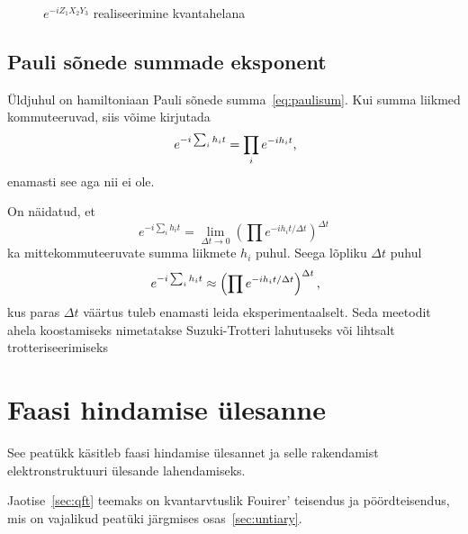 \documentclass[12pt]{report}
\def\paren#1{\left(#1\right)}
\begin{document}
\begin{figure}[h]
  \centering
  \caption{\(e^{-iZ_1X_2Y_3}\) realiseerimine kvantahelana}
  \label{f:zxyex}
\end{figure}

\section{Pauli sõnede summade eksponent}

Üldjuhul on hamiltoniaan Pauli sõnede summa~\ref{eq:paulisum}.
Kui summa liikmed kommuteeruvad, siis võime kirjutada
\begin{equation}
  e^{-i\sum_i h_it}=\prod_ie^{-ih_it}\rlap{,}
\end{equation}
enamasti see aga nii ei ole.

On näidatud, et
\begin{equation}
  e^{-i\sum_i h_it}=\lim_{\Delta t\rightarrow0}\paren{\prod e^{-ih_i t/\Delta t}}^{\Delta t}
\end{equation}
ka mittekommuteeruvate summa liikmete $h_i$ puhul.
Seega lõpliku $\Delta t$ puhul
\begin{equation}
  e^{-i\sum_i h_it}\approx\paren{\prod e^{-ih_i t/\Delta t}}^{\Delta t}\rlap{,}
\end{equation}
kus paras $\Delta t$ väärtus tuleb enamasti leida eksperimentaalselt.
Seda meetodit ahela koostamiseks nimetatakse Suzuki-Trotteri lahutuseks või lihtsalt trotteriseerimiseks~\cite{mansky+etal}

\chapter{Faasi hindamise ülesanne}

See peatükk käsitleb faasi hindamise ülesannet ja selle rakendamist elektronstruktuuri ülesande lahendamiseks.

Jaotise~\ref{sec:qft} teemaks on kvantarvtuslik Fouirer' teisendus ja pöördteisendus, mis on vajalikud peatüki järgmises osas~\ref{sec:untiary}.
\end{document}
